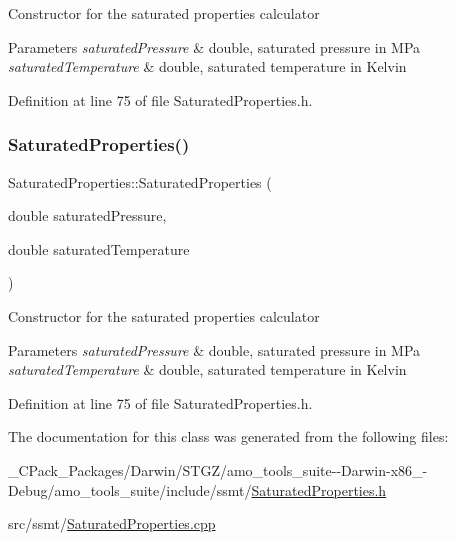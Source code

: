 Constructor for the saturated properties calculator 
\begin{DoxyParams}{Parameters}
{\em saturated\+Pressure} & double, saturated pressure in M\+Pa \\
\hline
{\em saturated\+Temperature} & double, saturated temperature in Kelvin \\
\hline
\end{DoxyParams}


Definition at line 75 of file Saturated\+Properties.\+h.

\mbox{\label{class_saturated_properties_a83cc16d024ff9bd7ac586df9e946a062}} 
\subsubsection{\texorpdfstring{Saturated\+Properties()}{SaturatedProperties()}\hspace{0.1cm}{\footnotesize\ttfamily [3/3]}}
{\footnotesize\ttfamily Saturated\+Properties\+::\+Saturated\+Properties (\begin{DoxyParamCaption}\item[{double}]{saturated\+Pressure,  }\item[{double}]{saturated\+Temperature }\end{DoxyParamCaption})\hspace{0.3cm}{\ttfamily [inline]}}

Constructor for the saturated properties calculator 
\begin{DoxyParams}{Parameters}
{\em saturated\+Pressure} & double, saturated pressure in M\+Pa \\
\hline
{\em saturated\+Temperature} & double, saturated temperature in Kelvin \\
\hline
\end{DoxyParams}


Definition at line 75 of file Saturated\+Properties.\+h.



The documentation for this class was generated from the following files\+:\begin{DoxyCompactItemize}
\item 
\+\_\+\+C\+Pack\+\_\+\+Packages/\+Darwin/\+S\+T\+G\+Z/amo\+\_\+tools\+\_\+suite-\/-\/\+Darwin-\/x86\+\_-\/\+Debug/amo\+\_\+tools\+\_\+suite/include/ssmt/\hyperlink{___c_pack___packages_2_darwin_2_s_t_g_z_2amo__tools__suite--_darwin-x86__64-_debug_2amo__tools__a4aa1517d601f9c2b44ebe76c8c6d4f0}{Saturated\+Properties.\+h}\item 
src/ssmt/\hyperlink{_saturated_properties_8cpp}{Saturated\+Properties.\+cpp}\end{DoxyCompactItemize}
